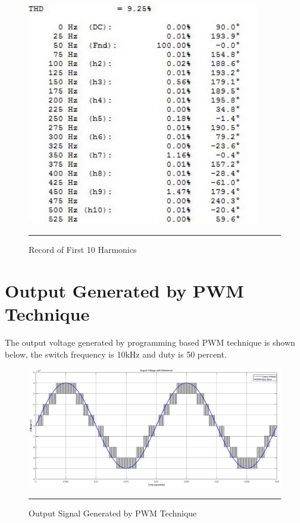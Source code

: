 \begin{figure}[htbp]
	\centering
	\includegraphics[width = 4in]{./Figures/Photos/Simulink/Output_FFT_tab.jpg}
	\rule{35em}{1pt}
	\caption{Record of First 10 Harmonics}
\end{figure}
\newpage

\section{Output Generated by PWM Technique}
The output voltage generated by programming based PWM technique is shown below, the switch frequency is 10kHz and duty is 50 percent.
\begin{figure}[htbp]
	\centering
	\includegraphics[width = 6in]{./Figures/Photos/Simulink/PWM_Out.jpg}
	\rule{35em}{1pt}
	\caption{Output Signal Generated by PWM Technique}
\end{figure}

